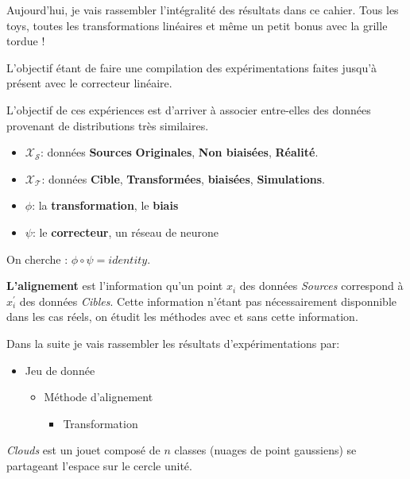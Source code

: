 
\label{day:24-05-2016}

Aujourd'hui, je vais rassembler l'intégralité des résultats dans ce cahier.
Tous les toys, toutes les transformations linéaires et même un petit bonus avec
la grille tordue !

L'objectif étant de faire une compilation des expérimentations faites jusqu'à présent
avec le correcteur linéaire.


L'objectif de ces expériences est d'arriver à associer entre-elles des données
provenant de distributions très similaires.

\begin{itemize}
	\item $\mathcal{X_S}$: données \textbf{Sources} \textbf{Originales}, \textbf{Non biaisées}, \textbf{Réalité}.
	\item $\mathcal{X_T}$: données \textbf{Cible}, \textbf{Transformées}, \textbf{biaisées}, \textbf{Simulations}.
	\item $\phi$: la \textbf{transformation}, le \textbf{biais}
	\item $\psi$: le \textbf{correcteur}, un réseau de neurone
\end{itemize}
On cherche : $\phi \circ \psi = identity$.

\textbf{L'alignement} est l'information qu'un point $x_i$ des données \emph{Sources} correspond 
à $x_i^\prime$ des données \emph{Cibles}. Cette information n'étant pas nécessairement 
disponnible dans les cas réels, on étudit les méthodes avec et sans cette information. 


Dans la suite je vais rassembler les résultats d'expérimentations par:
\begin{itemize}
	\item Jeu de donnée
	\begin{itemize}
		\item Méthode d'alignement
		\begin{itemize}
			\item Transformation
		\end{itemize}
	\end{itemize}
\end{itemize}


\emph{Clouds} est un jouet composé de $n$ classes (nuages de point gaussiens) se partageant 
l'espace sur le cercle unité.

